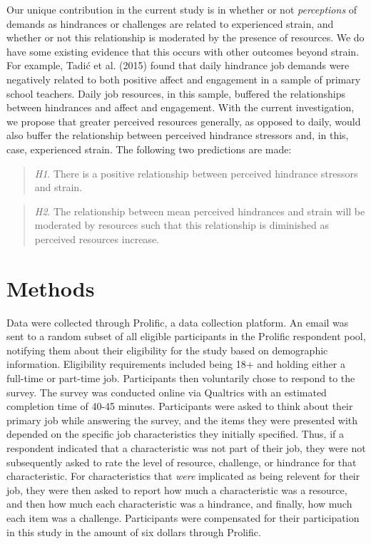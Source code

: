 \documentclass[
  man]{apa6}
\begin{document}
Our unique contribution in the current study is in whether or not \emph{perceptions} of demands as hindrances or challenges are related to experienced strain, and whether or not this relationship is moderated by the presence of resources. We do have some existing evidence that this occurs with other outcomes beyond strain. For example, Tadić et al. (2015) found that daily hindrance job demands were negatively related to both positive affect and engagement in a sample of primary school teachers. Daily job resources, in this sample, buffered the relationships between hindrances and affect and engagement. With the current investigation, we propose that greater perceived resources generally, as opposed to daily, would also buffer the relationship between perceived hindrance stressors and, in this, case, experienced strain. The following two predictions are made:

\begin{quote}
\emph{H1}. There is a positive relationship between perceived hindrance stressors and strain.
\end{quote}

\begin{quote}
\emph{H2}. The relationship between mean perceived hindrances and strain will be moderated by resources such that this relationship is diminished as perceived resources increase.
\end{quote}

\hypertarget{methods}{%
\section{Methods}\label{methods}}

Data were collected through Prolific, a data collection platform. An email was sent to a random subset of all eligible participants in the Prolific respondent pool, notifying them about their eligibility for the study based on demographic information. Eligibility requirements included being 18+ and holding either a full-time or part-time job. Participants then voluntarily chose to respond to the survey. The survey was conducted online via Qualtrics with an estimated completion time of 40-45 minutes. Participants were asked to think about their primary job while answering the survey, and the items they were presented with depended on the specific job characteristics they initially specified. Thus, if a respondent indicated that a characteristic was not part of their job, they were not subsequently asked to rate the level of resource, challenge, or hindrance for that characteristic. For characteristics that \emph{were} implicated as being relevent for their job, they were then asked to report how much a characteristic was a resource, and then how much each characteristic was a hindrance, and finally, how much each item was a challenge. Participants were compensated for their participation in this study in the amount of six dollars through Prolific.
\end{document}
